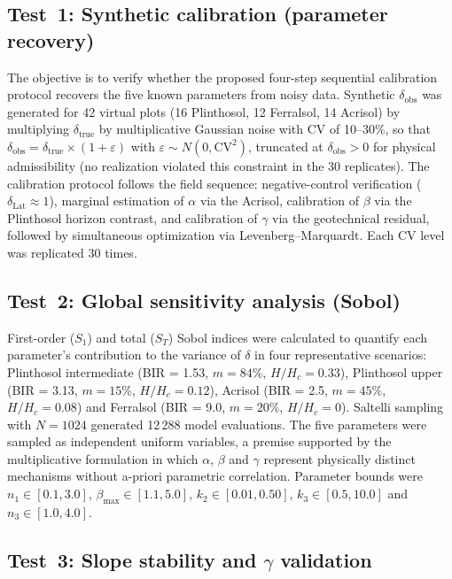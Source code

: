 \documentclass[pdflatex,sn-basic,referee,lineno]{sn-jnl}
\begin{document}
\subsection{Test~1: Synthetic calibration (parameter recovery)}

The objective is to verify whether the proposed four-step sequential calibration protocol recovers the five known parameters from noisy data. Synthetic $\delta_{\mathrm{obs}}$ was generated for 42 virtual plots (16 Plinthosol, 12 Ferralsol, 14 Acrisol) by multiplying $\delta_{\mathrm{true}}$ by multiplicative Gaussian noise with CV of 10--30\%, so that $\delta_{\mathrm{obs}} = \delta_{\mathrm{true}} \times (1 + \varepsilon)$ with $\varepsilon \sim N(0, \mathrm{CV}^2)$, truncated at $\delta_{\mathrm{obs}} > 0$ for physical admissibility (no realization violated this constraint in the 30 replicates). The calibration protocol follows the field sequence: negative-control verification ($\delta_{\mathrm{Lat}} \approx 1$), marginal estimation of $\alpha$ via the Acrisol, calibration of $\beta$ via the Plinthosol horizon contrast, and calibration of $\gamma$ via the geotechnical residual, followed by simultaneous optimization via Levenberg--Marquardt. Each CV level was replicated 30 times.

\subsection{Test~2: Global sensitivity analysis (Sobol)}

First-order ($S_1$) and total ($S_T$) Sobol indices \citep{sobol_2001} were calculated to quantify each parameter's contribution to the variance of $\delta$ in four representative scenarios: Plinthosol intermediate (BIR = 1.53, $m = 84\%$, $H/H_c = 0.33$), Plinthosol upper (BIR = 3.13, $m = 15\%$, $H/H_c = 0.12$), Acrisol (BIR = 2.5, $m = 45\%$, $H/H_c = 0.08$) and Ferralsol (BIR = 9.0, $m = 20\%$, $H/H_c = 0$). Saltelli sampling \citep{saltelli_et_al_2004} with $N = 1024$ generated 12\,288 model evaluations. The five parameters were sampled as independent uniform variables, a premise supported by the multiplicative formulation in which $\alpha$, $\beta$ and $\gamma$ represent physically distinct mechanisms without a-priori parametric correlation. Parameter bounds were $n_1 \in [0.1, 3.0]$, $\beta_{\max} \in [1.1, 5.0]$, $k_2 \in [0.01, 0.50]$, $k_3 \in [0.5, 10.0]$ and $n_3 \in [1.0, 4.0]$.

\subsection{Test~3: Slope stability and \texorpdfstring{$\gamma$}{gamma} validation}
\label{sec:test3}
\end{document}
